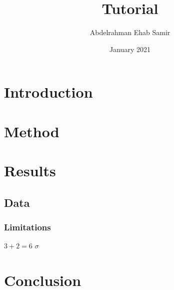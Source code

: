 \documentclass{article}
\title{Tutorial}
\author{Abdelrahman Ehab Samir}
\date{January 2021}
\begin{document}
\maketitle

\section{Introduction}

\section{Method}

\section{Results}
\subsection{Data}
\subsubsection{Limitations}
$3 + 2 = 6$
$\sigma$
\section{Conclusion}
\end{document}
